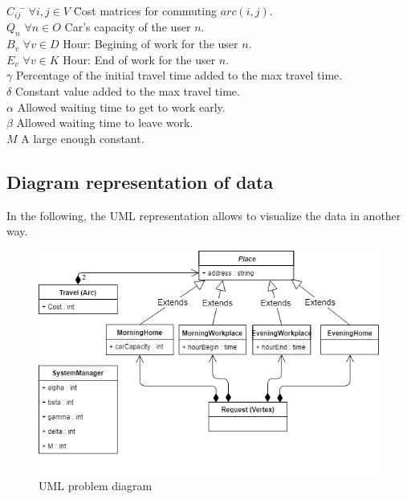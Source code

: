 \documentclass[12pt, a4paper,twoside]{memoir}
\newcommand\tab[1][1cm]{\hspace*{#1}}
\begin{document}
	\begin{tabbing}
		$C_{ij}$ \tab \= $\forall i,j\in V$ \tab \= Cost matrices for commuting $arc(i,j)$. \\
		
		$Q_{n}$ \> $\forall n\in O$ \> Car's capacity of the user $n$. \\
		
		$B_{v}$ \> $\forall v\in D$ \> Hour: Begining of work for the user $n$. \\
		$E_{v}$ \> $\forall v\in K$ \> Hour: End of work for the user $n$. \\
		
		$\gamma$ \> \> Percentage of the initial travel time added to the max travel time. \\
		$\delta$ \> \> Constant value added to the max travel time. \\
		$\alpha$ \> \> Allowed waiting time to get to work early. \\
		$\beta$ \> \> Allowed waiting time to leave work. \\
		
		$M$ \> \> A large enough constant. \\
	\end{tabbing}
	
	\subsection{Diagram representation of data}
	
	In the following, the UML representation allows to visualize the data in another way.
	
	\begin{figure}[H]
		\centering
		\begin{flushleft}
			\includegraphics[scale=0.7]{img/i_umlproblemdata.png}
		\end{flushleft}
		\caption{UML problem diagram}
		\label{fig:UML Diagram}
	\end{figure}
	
\end{document}

